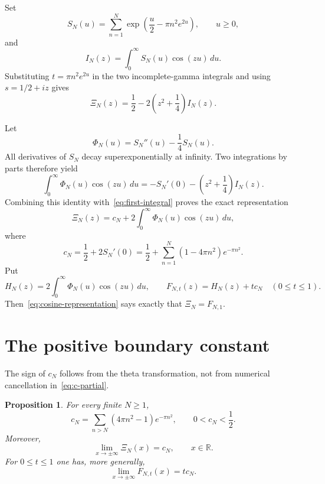 \documentclass[11pt,a4paper]{amsart}
\newtheorem{proposition}[theorem]{Proposition}
\theoremstyle{remark}
\newcommand{\R}{\mathbb R}
\newcommand{\XiN}{\Xi_N}
\begin{document}
Set
\begin{equation}\label{eq:S-def}
 S_N(u)=\sum_{n=1}^N\exp\!\left(\frac u2-\pi n^2e^{2u}\right),
 \qquad u\geq0,
\end{equation}
and
\[
 I_N(z)=\int_0^\infty S_N(u)\cos(zu)\,du.
\]
Substituting $t=\pi n^2e^{2u}$ in the two incomplete-gamma integrals and
using $s=1/2+iz$ gives
\begin{equation}\label{eq:first-integral}
 \XiN(z)=\frac12-2\left(z^2+\frac14\right)I_N(z).
\end{equation}

Let
\begin{equation}\label{eq:phi-def}
 \Phi_N(u)=S_N''(u)-\frac14S_N(u).
\end{equation}
All derivatives of $S_N$ decay superexponentially at infinity.  Two
integrations by parts therefore yield
\[
 \int_0^\infty \Phi_N(u)\cos(zu)\,du
 =-S_N'(0)-\left(z^2+\frac14\right)I_N(z).
\]
Combining this identity with~\eqref{eq:first-integral} proves the exact
representation
\begin{equation}\label{eq:cosine-representation}
 \XiN(z)=c_N+2\int_0^\infty \Phi_N(u)\cos(zu)\,du,
\end{equation}
where
\begin{equation}\label{eq:c-partial}
 c_N=\frac12+2S_N'(0)
 =\frac12+\sum_{n=1}^N(1-4\pi n^2)e^{-\pi n^2}.
\end{equation}
Put
\begin{equation}\label{eq:shift-family}
 H_N(z)=2\int_0^\infty\Phi_N(u)\cos(zu)\,du,
 \qquad
 F_{N,t}(z)=H_N(z)+t c_N \quad (0\leq t\leq1).
\end{equation}
Then~\eqref{eq:cosine-representation} says exactly that
$\Xi_N=F_{N,1}$.

\section{The positive boundary constant}\label{sec:boundary}

The sign of $c_N$ follows from the theta transformation, not from numerical
cancellation in~\eqref{eq:c-partial}.

\begin{proposition}\label{prop:constant}
For every finite $N\geq1$,
\begin{equation}\label{eq:c-tail}
 c_N=\sum_{n>N}(4\pi n^2-1)e^{-\pi n^2},
 \qquad 0<c_N<\frac12.
\end{equation}
Moreover,
\begin{equation}\label{eq:real-limit}
 \lim_{x\to\pm\infty}\XiN(x)=c_N,
 \qquad x\in\R.
\end{equation}
For $0\leq t\leq1$ one has, more generally,
\begin{equation}\label{eq:shift-limit}
 \lim_{x\to\pm\infty}F_{N,t}(x)=t c_N.
\end{equation}
\end{proposition}
\end{document}
